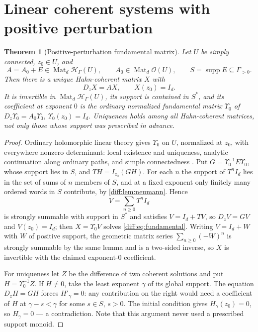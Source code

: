 \documentclass[11pt,letterpaper]{article}
\numberwithin{equation}{section}
\newtheorem{theorem}{Theorem}[section]
\theoremstyle{definition}
\theoremstyle{remark}
\newcommand{\supp}{\operatorname{supp}}
\newcommand{\Hring}{\mathscr H}
\newcommand{\Hol}{\mathscr O}
\newcommand{\Dz}{D_{z}}
\newcommand{\Mat}{\operatorname{Mat}}
\begin{document}
\section{Linear coherent systems with positive perturbation}
\label{diff:sec:coherentlinear}

\begin{theorem}[Positive-perturbation fundamental matrix]
\label{diff:thm:coherentlinear}
Let $U$ be simply connected, $z_{0}\in U$, and
\[
 A=A_{0}+E\in\Mat_{d}\Hring_{\Gamma}(U),
 \qquad A_{0}\in\Mat_{d}\Hol(U),
 \qquad S=\supp E\subseteq\Gamma_{>0}.
\]
Then there is a \emph{unique} Hahn-coherent matrix $X$ with
\begin{equation}\label{diff:eq:fundamental}
 \Dz X=AX,\qquad X(z_{0})=I_{d}.
\end{equation}
It is invertible in $\Mat_{d}\Hring_{\Gamma}(U)$, its support is contained in
$S^{*}$, and its coefficient at exponent $0$ is the ordinary normalized
fundamental matrix $\Upsilon_{0}$ of $\Dz\Upsilon_{0}=A_{0}\Upsilon_{0}$,
$\Upsilon_{0}(z_{0})=I_{d}$. Uniqueness holds among \emph{all} Hahn-coherent
matrices, not only those whose support was prescribed in advance.
\end{theorem}
\begin{proof}
Ordinary holomorphic linear theory gives $\Upsilon_{0}$ on $U$, normalized at
$z_{0}$, with everywhere nonzero determinant: local existence and uniqueness,
analytic continuation along ordinary paths, and simple connectedness
\cite[Ch.\ 4]{Teschl}. Put $G=\Upsilon_{0}^{-1}E\Upsilon_{0}$, whose support lies in
$S$, and $T H=I_{z_{0}}(GH)$. For each $n$ the support of $T^{n}I_{d}$ lies in
the set of sums of $n$ members of $S$, and at a fixed exponent only finitely
many ordered words in $S$ contribute, by \cref{diff:lem:neumann}. Hence
\begin{equation}\label{diff:eq:peano}
 V=\sum_{n\geq0}T^{n}I_{d}
\end{equation}
is strongly summable with support in $S^{*}$ and satisfies $V=I_{d}+TV$, so
$\Dz V=GV$ and $V(z_{0})=I_{d}$; then $X=\Upsilon_{0}V$ solves
\cref{diff:eq:fundamental}. Writing $V=I_{d}+W$ with $W$ of positive support,
the geometric matrix series $\sum_{n\geq0}(-W)^{n}$ is strongly summable by the
same lemma and is a two-sided inverse, so $X$ is invertible with the claimed
exponent-$0$ coefficient.

For uniqueness let $Z$ be the difference of two coherent solutions and put
$H=\Upsilon_{0}^{-1}Z$. If $H\neq0$, take the least exponent $\gamma$ of its global
support. The equation $\Dz H=GH$ forces $H'_{\gamma}=0$: any contribution on
the right would need a coefficient of $H$ at $\gamma-s<\gamma$ for some
$s\in S$, $s>0$. The initial condition gives $H_{\gamma}(z_{0})=0$, so
$H_{\gamma}=0$ --- a contradiction. Note that this argument never used a
prescribed support monoid.
\end{proof}
\end{document}

